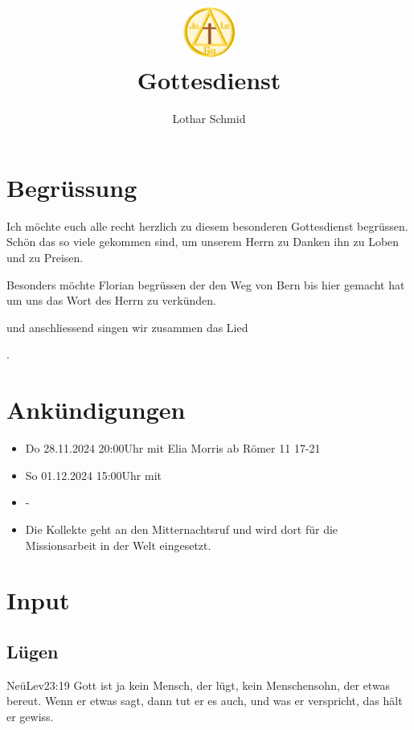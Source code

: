 \documentclass{../inc/mybib}
\title{\includegraphics[height=48pt]{../assets/images/logo.png}\\Gottesdienst}
\author{Lothar Schmid}
\begin{document}
\maketitle
\section{Begrüssung}

Ich möchte euch alle recht herzlich zu diesem besonderen Gottesdienst begrüssen. Schön das so viele gekommen sind, um unserem Herrn zu Danken ihn zu Loben und zu Preisen.

Besonders möchte Florian begrüssen der den Weg von Bern bis hier gemacht hat um uns das Wort des Herrn zu verkünden. 

\noindent
\beten{} und anschliessend singen wir zusammen das Lied

\noindent
{}.

\section{Ankündigungen}
\begin{itemize}
    \item {} Do 28.11.2024 20:00Uhr mit Elia Morris ab Römer 11 17-21
    \item {} So 01.12.2024 15:00Uhr mit 
    \item {} -
    \item {} Die Kollekte geht an den Mitternachtsruf und wird dort für die Missionsarbeit in der Welt eingesetzt.
\end{itemize}

\section{ Input }
\begin{spacing}{1.5}
\subsection{Lügen}

\begin{bibelbox}{Neü}{Lev}{23:19}
Gott ist ja kein Mensch, der lügt, kein Menschensohn, der etwas bereut. Wenn er etwas sagt, dann tut er es auch, und was er verspricht, das hält er gewiss.
\end{bibelbox}


\end{spacing}
\end{document}
